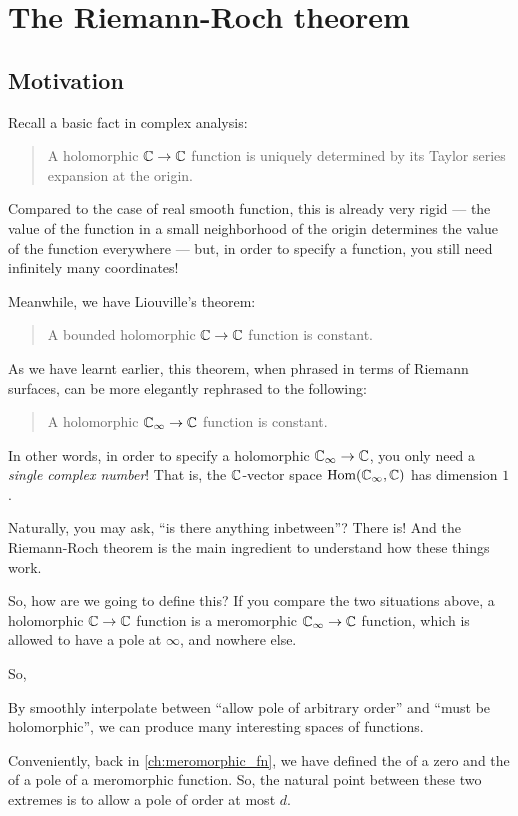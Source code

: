 \chapter{The Riemann-Roch theorem}
\label{ch:riemann_roch}

\section{Motivation}

Recall a basic fact in complex analysis:
\begin{quote}
	A holomorphic $\mathbb C \to \mathbb C$ function is uniquely determined by its Taylor series expansion at
	the origin.
\end{quote}

Compared to the case of real smooth function, this is already very rigid --- the value of the
function in a small neighborhood of the origin determines the value of the function everywhere ---
but, in order to specify a function, you still need infinitely many coordinates!

Meanwhile, we have Liouville's theorem:
\begin{quote}
	A bounded holomorphic $\mathbb C \to \mathbb C$ function is constant.
\end{quote}
As we have learnt earlier, this theorem, when phrased in terms of Riemann surfaces, can be more
elegantly rephrased to the following:
\begin{quote}
	A holomorphic $\mathbb C_\infty \to \mathbb C$ function is constant.
\end{quote}
In other words, in order to specify a holomorphic $\mathbb C_\infty \to \mathbb C$, you only need a \emph{single
complex number}! That is, the $\mathbb C$-vector space $\operatorname{Hom}(\mathbb C_\infty, \mathbb C)$ has dimension $1$.

Naturally, you may ask, ``is there anything inbetween''? There is! And the Riemann-Roch theorem is
the main ingredient to understand how these things work.

So, how are we going to define this? If you compare the two situations above,
a holomorphic $\mathbb C \to \mathbb C$ function is a meromorphic $\mathbb C_\infty \to \mathbb C$ function, which
is allowed to have a pole at $\infty$, and nowhere else.

So,
\begin{moral}
	By smoothly interpolate between ``allow pole of arbitrary order'' and ``must be holomorphic'',
	we can produce many interesting spaces of functions.
\end{moral}

Conveniently, back in \cref{ch:meromorphic_fn}, we have defined the  of a
zero and the  of a pole of a meromorphic function.
So, the natural point between these two extremes is to allow a pole of order at most $d$.

